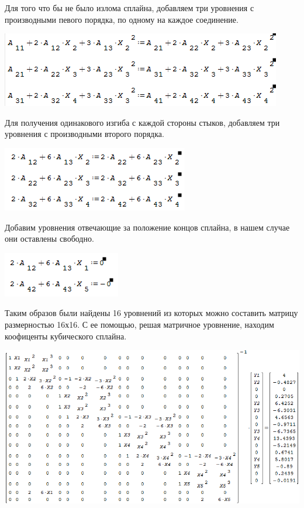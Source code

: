 \documentclass[russian,utf8,nocolumnxxxi,nocolumnxxxii]{eskdtext}
\begin{document}
{\par
\newpage
\normalsize
Для того что бы не было излома сплайна, добавляем три уровнения с производными певого порядка, по одному на каждое соединение.
\begin{center}\includegraphics[scale=0.8]{2019-01-09_03-26-45}\end{center}
\par
\normalsize
Для получения одинакового изгиба с каждой стороны стыков, добавляем три уровнения с производными второго порядка.
\begin{center}\includegraphics[scale=0.8]{2019-01-09_03-31-08}\end{center}
\par
\normalsize
Добавим уровнения отвечающие за положение концов сплайна, в нашем случае они оставлены свободно.
\begin{center}\includegraphics[scale=0.8]{2019-01-09_03-34-49}\end{center}
\newpage
\par
\normalsize
Таким образов были найдены 16 уровнений из которых можно составить матрицу размерностью 16х16. С ее помощью, решая матричное уровнение, находим коофиценты кубического сплайна.
\begin{center}\includegraphics[scale=0.6]{2019-01-09_03-36-31}\end{center}
}
\end{document}
